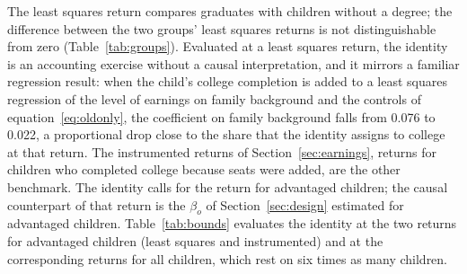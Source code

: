 \documentclass[11pt]{article}
\begin{document}
The least squares return compares graduates with children without a degree; the difference between the two groups' least squares returns is not distinguishable from zero (Table~\ref{tab:groups}). Evaluated at a least squares return, the identity is an accounting exercise without a causal interpretation, and it mirrors a familiar regression result: when the child's college completion is added to a least squares regression of the level of earnings on family background and the controls of equation~\eqref{eq:oldonly}, the coefficient on family background falls from 0.076 to 0.022, a proportional drop close to the share that the identity assigns to college at that return. The instrumented returns of Section~\ref{sec:earnings}, returns for children who completed college because seats were added, are the other benchmark. The identity calls for the return for advantaged children; the causal counterpart of that return is the $\beta_o$ of Section~\ref{sec:design} estimated for advantaged children. Table~\ref{tab:bounds} evaluates the identity at the two returns for advantaged children (least squares and instrumented) and at the corresponding returns for all children, which rest on six times as many children.
\end{document}
